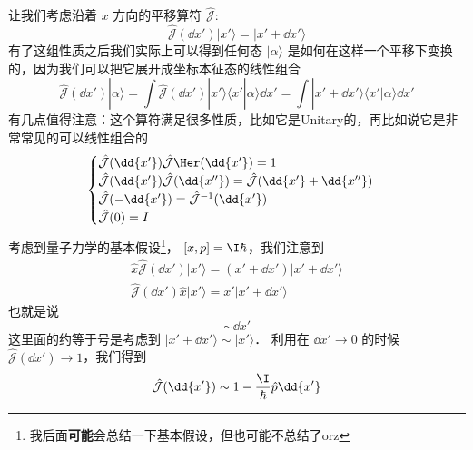 让我们考虑沿着 $x$ 方向的平移算符 $\hat{\mathcal J}$: 
\begin{equation}
\hat{\mathcal{J}}(\dd{x'})|x'\rangle = |x'+\dd{x'}\rangle
\end{equation}
有了这组性质之后我们实际上可以得到任何态 $|\alpha\rangle$ 是如何在这样一个平移下变换的，因为我们可以把它展开成坐标本征态的线性组合
\begin{equation}
\hat{\mathcal{J}}(\dd{x'})|\alpha\rangle = \int\hat{\mathcal{J}}(\dd{x'})|x'\rangle\langle x'|\alpha\rangle \dd{x'} = \int|x'+\dd{x'}\rangle\langle x'|\alpha\rangle \dd{x'}
\end{equation}
有几点值得注意：这个算符满足很多性质，比如它是Unitary的，再比如说它是非常常见的可以线性组合的
\begin{equation}
\begin{cases}
\hat{\mathcal{J}}(\dd{x'})\hat{\mathcal{J}}\Her (\dd{x'}) = 1\\
\hat{\mathcal{J}}(\dd{x'})\hat{\mathcal{J}}(\dd{x''}) = \hat{\mathcal{J}}(\dd{x'} + \dd{x''})\\
\hat{\mathcal{J}}(-\dd{x'}) = \hat{\mathcal{J}}^{-1}(\dd{x'})\\
\hat{\mathcal{J}}(0) = I
\end{cases}
\end{equation}
考虑到量子力学的基本假设\footnote{我后面\textbf{可能}会总结一下基本假设，但也可能不总结了orz}， $[x,p] = \I\hbar$，我们注意到
\begin{gather}
\hat{x}\hat{\mathcal{J}}(\dd{x'})|x'\rangle = (x'+\dd{x'})|x'+\dd{x'}\rangle\\
\hat{\mathcal{J}}(\dd{x'})\hat{x}|x'\rangle = x'|x'+\dd{x'}\rangle
\end{gather}
也就是说
\begin{equation}
[\hat{x},\hat{\mathcal{J}}(\dd{x'})] \sim \dd{x'}
\end{equation}
这里面的约等于号是考虑到 $|x'+\dd{x'}\rangle \sim |x'\rangle$． 利用在 $\dd{x'}\rightarrow0$ 的时候 $\hat{\mathcal{J}}(\dd{x'})\rightarrow1$，我们得到
\begin{equation}
\hat{\mathcal{J}}(\dd{x'}) \sim 1-\frac{\I}{\hbar}\hat{p}\dd{x'}
\end{equation}

